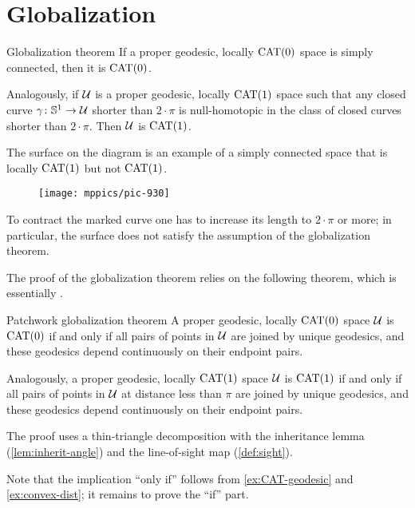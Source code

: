 \section{Globalization}\label{sec:Hadamard--Cartan}



\begin{thm}{Globalization theorem}
\label{thm:hadamard-cartan}
If a proper geodesic, locally $\mathrm{CAT}(0)$ space is simply connected, then it 
is $\mathrm{CAT}(0)$.

Analogously, if $\mathcal{U}$ is a proper geodesic, locally $\mathrm{CAT}(1)$ space
such that any closed curve $\gamma\colon\mathbb{S}^1\to \mathcal{U}$ shorter than $2\cdot\pi$
is null-homotopic in the class of closed curves shorter than $2\cdot\pi$.
Then $\mathcal{U}$ is $\mathrm{CAT}(1)$.
\end{thm}


The surface on the diagram 
is an example of a simply connected space that  is locally $\mathrm{CAT}(1)$ but not $\mathrm{CAT}(1)$.
\begin{figure}[ht!]
\vskip0mm
\centering
\texttt{[image: mppics/pic-930]}
\end{figure}
To contract the marked curve one has to increase its length to $2\cdot\pi$ or more;
in particular, the surface does not satisfy the assumption of the globalization theorem.


The proof of the globalization theorem relies on the following theorem, 
which is essentially  \cite[Satz 9]{alexandrov-1957}.  

\begin{thm}{Patchwork globalization theorem}\label{thm:alex-patch}
A proper geodesic, locally $\mathrm{CAT}(0)$ space $\mathcal{U}$ is $\mathrm{CAT}(0)$
if and only if all pairs of points in $\mathcal{U}$  are joined by unique geodesics, and these geodesics depend continuously on their endpoint pairs.

Analogously, a proper geodesic, locally $\mathrm{CAT}(1)$ space $\mathcal{U}$ is $\mathrm{CAT}(1)$ 
if and only if all pairs of points in $\mathcal{U}$ at distance less than $\pi$ are joined by unique geodesics, and these geodesics depend continuously on their endpoint pairs.
\end{thm}

The proof uses a thin-triangle decomposition with the inheritance lemma (\ref{lem:inherit-angle}) and the line-of-sight map (\ref{def:sight}).

Note that the implication ``only if'' follows from \ref{ex:CAT-geodesic} and \ref{ex:convex-dist}; it remains to prove the ``if'' part.

